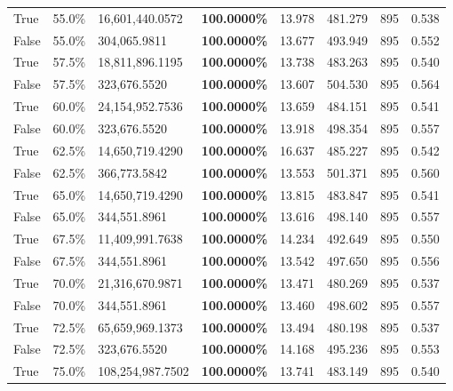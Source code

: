 \begin{table}[H]
\begin{tabular}{lllrllll}
\cline{1-8}
True & 55.0\% & 16,601,440.0572 & \bfseries \color{red} 100.0000\% & 13.978 & 481.279 & 895 & 0.538 \\
\cline{1-8}
False & 55.0\% & \color{red} 304,065.9811 & \bfseries \color{red} 100.0000\% & 13.677 & 493.949 & 895 & 0.552 \\
\cline{1-8}
True & 57.5\% & 18,811,896.1195 & \bfseries \color{red} 100.0000\% & 13.738 & 483.263 & 895 & 0.540 \\
\cline{1-8}
False & 57.5\% & 323,676.5520 & \bfseries \color{red} 100.0000\% & 13.607 & 504.530 & 895 & 0.564 \\
\cline{1-8}
True & 60.0\% & 24,154,952.7536 & \bfseries \color{red} 100.0000\% & 13.659 & 484.151 & 895 & 0.541 \\
\cline{1-8}
False & 60.0\% & 323,676.5520 & \bfseries \color{red} 100.0000\% & 13.918 & 498.354 & 895 & 0.557 \\
\cline{1-8}
True & 62.5\% & 14,650,719.4290 & \bfseries \color{red} 100.0000\% & 16.637 & 485.227 & 895 & 0.542 \\
\cline{1-8}
False & 62.5\% & 366,773.5842 & \bfseries \color{red} 100.0000\% & 13.553 & 501.371 & 895 & 0.560 \\
\cline{1-8}
True & 65.0\% & 14,650,719.4290 & \bfseries \color{red} 100.0000\% & 13.815 & 483.847 & 895 & 0.541 \\
\cline{1-8}
False & 65.0\% & 344,551.8961 & \bfseries \color{red} 100.0000\% & 13.616 & 498.140 & 895 & 0.557 \\
\cline{1-8}
True & 67.5\% & 11,409,991.7638 & \bfseries \color{red} 100.0000\% & 14.234 & 492.649 & 895 & 0.550 \\
\cline{1-8}
False & 67.5\% & 344,551.8961 & \bfseries \color{red} 100.0000\% & 13.542 & 497.650 & 895 & 0.556 \\
\cline{1-8}
True & 70.0\% & 21,316,670.9871 & \bfseries \color{red} 100.0000\% & 13.471 & 480.269 & 895 & 0.537 \\
\cline{1-8}
False & 70.0\% & 344,551.8961 & \bfseries \color{red} 100.0000\% & 13.460 & 498.602 & 895 & 0.557 \\
\cline{1-8}
True & 72.5\% & 65,659,969.1373 & \bfseries \color{red} 100.0000\% & 13.494 & 480.198 & 895 & 0.537 \\
\cline{1-8}
False & 72.5\% & 323,676.5520 & \bfseries \color{red} 100.0000\% & 14.168 & 495.236 & 895 & 0.553 \\
\cline{1-8}
True & 75.0\% & 108,254,987.7502 & \bfseries \color{red} 100.0000\% & 13.741 & 483.149 & 895 & 0.540 \\

\end{tabular}
\end{table}
